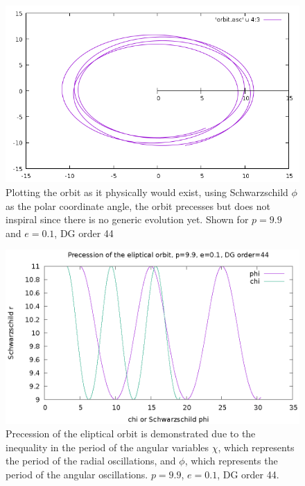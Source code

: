 \begin{figure}
  \includegraphics{orbitevolvedg44p99e01}
  \caption{Plotting the orbit as it physically would exist, using Schwarzschild $\phi$ as the polar coordinate angle, the orbit precesses but does not inspiral since there is no generic evolution yet. Shown for $p=9.9$ and $e=0.1$, DG order 44}
\end{figure}


\begin{figure}
  \includegraphics{precessiondg44p99e01}
  \caption{Precession of the eliptical orbit is demonstrated due to the inequality in the period of the angular variables $\chi$, which represents the period of the radial oscillations, and $\phi$, which represents the period of the angular oscillations. $p=9.9$, $e=0.1$, DG order 44.}
\end{figure}




